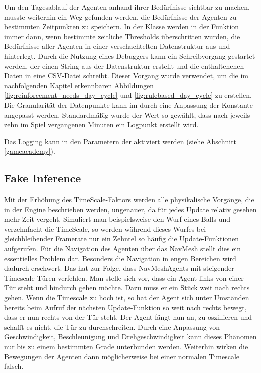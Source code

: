 Um den Tagesablauf der Agenten anhand ihrer Bedürfnisse sichtbar zu machen, musste weiterhin ein Weg gefunden werden, die Bedürfnisse der Agenten zu bestimmten Zeitpunkten zu speichern. In der Klasse  werden in der Funktion  immer dann, wenn bestimmte zeitliche Thresholds überschritten wurden, die Bedürfnisse aller Agenten in einer verschachtelten Datenstruktur aus  und  hinterlegt. Durch die Nutzung eines Debuggers kann ein Schreibvorgang gestartet werden, der einen String aus der Datenstruktur erstellt und die enthaltenenen Daten in eine CSV-Datei schreibt. Dieser Vorgang wurde verwendet, um die im nachfolgenden Kapitel erkennbaren Abbildungen \ref{fig:reinforcement_needs_day_cycle} und \ref{fig:rulebased_day_cycle} zu erstellen. Die Granularität der Datenpunkte kann im  durch eine Anpassung der Konstante  angepasst werden. Standardmäßig wurde der Wert so gewählt, dass nach jeweils zehn im Spiel vergangenen Minuten ein Logpunkt erstellt wird.

Das Logging kann in den Parametern der  aktiviert werden (siehe Abschnitt \ref{gameacademy}).





\subsection{Fake Inference}\label{modes_fake_inference_etc}
Mit der Erhöhung des TimeScale-Faktors werden alle physikalische Vorgänge, die in der Engine beschrieben werden, ungenauer, da für jedes Update relativ gesehen mehr Zeit vergeht. Simuliert man beispielsweise den Wurf eines Balls und verzehnfacht die TimeScale, so werden während dieses Wurfes bei gleichbleibender Framerate nur ein Zehntel so häufig die Update-Funktionen aufgerufen.
Für die Navigation des Agenten über das NavMesh stellt dies ein essentielles Problem dar. Besonders die Navigation in engen Bereichen wird dadurch erschwert. Das hat zur Folge, dass NavMeshAgents mit steigender Timescale Türen verfehlen. Man stelle sich vor, dass ein Agent links von einer Tür steht und hindurch gehen möchte. Dazu muss er ein Stück weit nach rechts gehen. Wenn die Timescale zu hoch ist, so hat der Agent sich unter Umständen bereits beim Aufruf der nächsten Update-Funktion so weit nach rechts bewegt, dass er nun rechts von der Tür steht. Der Agent fängt nun an, zu oszillieren und schafft es nicht, die Tür zu durchschreiten. Durch eine Anpassung von Geschwindigkeit, Beschleunigung und Drehgeschwindigkeit kann dieses Phänomen nur bis zu einem bestimmten Grade unterbunden werden. Weiterhin wirken die Bewegungen der Agenten dann möglicherweise bei einer normalen Timescale falsch.

